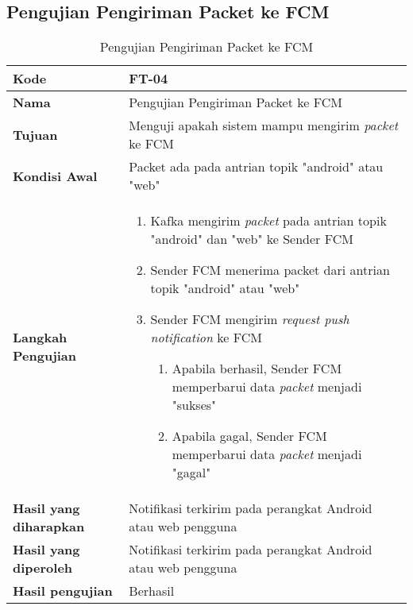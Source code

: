 \subsection{Pengujian Pengiriman Packet ke FCM}
\begin{longtable}{|p{2.5cm}|p{6.5cm}|}
	\caption{Pengujian Pengiriman Packet ke FCM} \label{t:uji_pengiriman_packet_fcm} \\ \hline
	\textbf{Kode} & FT-04 \\ \hline
	\textbf{Nama} & Pengujian Pengiriman Packet ke FCM \\ \hline
	\textbf{Tujuan} & Menguji apakah sistem mampu mengirim \textit{packet} ke FCM \\ \hline
	\textbf{Kondisi Awal} &  Packet ada pada antrian topik "android" atau "web"\\ \hline
	\textbf{Langkah Pengujian} &  
	\begin{enumerate}
		\item Kafka mengirim \textit{packet} pada antrian topik "android" dan "web" ke Sender FCM
		\item Sender FCM menerima packet dari antrian topik "android" atau "web"
		\item Sender FCM mengirim \textit{request push notification} ke FCM
		\begin{enumerate}
			\item Apabila berhasil, Sender FCM memperbarui data \textit{packet} menjadi "sukses"
			\item Apabila gagal, Sender FCM memperbarui data \textit{packet} menjadi "gagal"
		\end{enumerate}
	\end{enumerate} \\ \hline
	\textbf{Hasil yang diharapkan} & Notifikasi terkirim pada perangkat Android atau web pengguna \\ \hline
	\textbf{Hasil yang diperoleh} & Notifikasi terkirim pada perangkat Android atau web pengguna \\ \hline
	\textbf{Hasil pengujian} & Berhasil \\ \hline
\end{longtable}

